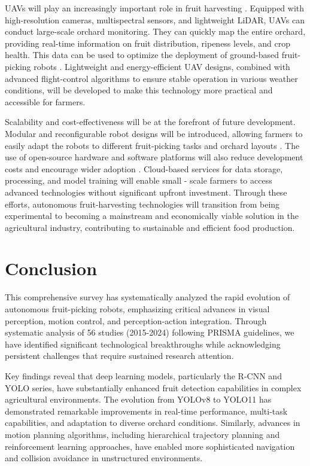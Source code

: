 \documentclass[a4paper,fleqn]{cas-dc}
\begin{document}
UAVs will play an increasingly important role in fruit harvesting \cite{mohamed2021smart, martos2021ensuring}. Equipped with high-resolution cameras, multispectral sensors, and lightweight LiDAR, UAVs can conduct large-scale orchard monitoring. They can quickly map the entire orchard, providing real-time information on fruit distribution, ripeness levels, and crop health. This data can be used to optimize the deployment of ground-based fruit-picking robots \cite{martos2021ensuring}. Lightweight and energy-efficient UAV designs, combined with advanced flight-control algorithms to ensure stable operation in various weather conditions, will be developed to make this technology more practical and accessible for farmers.

Scalability and cost-effectiveness will be at the forefront of future development. Modular and reconfigurable robot designs will be introduced, allowing farmers to easily adapt the robots to different fruit-picking tasks and orchard layouts \cite{lytridis2021overview, li2023multi}. The use of open-source hardware and software platforms will also reduce development costs and encourage wider adoption \cite{zhang2024automatic}. Cloud-based services for data storage, processing, and model training will enable small - scale farmers to access advanced technologies without significant upfront investment. Through these efforts, autonomous fruit-harvesting technologies will transition from being experimental to becoming a mainstream and economically viable solution in the agricultural industry, contributing to sustainable and efficient food production.



\section{Conclusion}
This comprehensive survey has systematically analyzed the rapid evolution of autonomous fruit-picking robots, emphasizing critical advances in visual perception, motion control, and perception-action integration. Through systematic analysis of 56 studies (2015-2024) following PRISMA guidelines, we have identified significant technological breakthroughs while acknowledging persistent challenges that require sustained research attention.

Key findings reveal that deep learning models, particularly the R-CNN and YOLO series, have substantially enhanced fruit detection capabilities in complex agricultural environments. The evolution from YOLOv8 to YOLO11 has demonstrated remarkable improvements in real-time performance, multi-task capabilities, and adaptation to diverse orchard conditions. Similarly, advances in motion planning algorithms, including hierarchical trajectory planning and reinforcement learning approaches, have enabled more sophisticated navigation and collision avoidance in unstructured environments.
\end{document}

